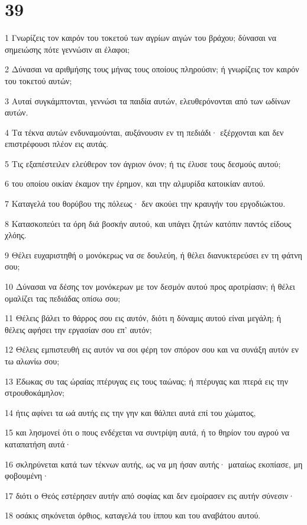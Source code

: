 \chapter{39}

\par 1 Γνωρίζεις τον καιρόν του τοκετού των αγρίων αιγών του βράχου; δύνασαι να σημειώσης πότε γεννώσιν αι έλαφοι;
\par 2 Δύνασαι να αριθμήσης τους μήνας τους οποίους πληρούσιν; ή γνωρίζεις τον καιρόν του τοκετού αυτών;
\par 3 Αυταί συγκάμπτονται, γεννώσι τα παιδία αυτών, ελευθερόνονται από των ωδίνων αυτών.
\par 4 Τα τέκνα αυτών ενδυναμούνται, αυξάνουσιν εν τη πεδιάδι· εξέρχονται και δεν επιστρέφουσι πλέον εις αυτάς.
\par 5 Τις εξαπέστειλεν ελεύθερον τον άγριον όνον; ή τις έλυσε τους δεσμούς αυτού;
\par 6 του οποίου οικίαν έκαμον την έρημον, και την αλμυρίδα κατοικίαν αυτού.
\par 7 Καταγελά του θορύβου της πόλεως· δεν ακούει την κραυγήν του εργοδιώκτου.
\par 8 Κατασκοπεύει τα όρη διά βοσκήν αυτού, και υπάγει ζητών κατόπιν παντός είδους χλόης.
\par 9 Θέλει ευχαριστηθή ο μονόκερως να σε δουλεύη, ή θέλει διανυκτερεύσει εν τη φάτνη σου;
\par 10 Δύνασαι να δέσης τον μονόκερων με τον δεσμόν αυτού προς αροτρίασιν; ή θέλει ομαλίζει τας πεδιάδας οπίσω σου;
\par 11 Θέλεις βάλει το θάρρος σου εις αυτόν, διότι η δύναμις αυτού είναι μεγάλη; ή θέλεις αφήσει την εργασίαν σου επ' αυτόν;
\par 12 Θέλεις εμπιστευθή εις αυτόν να σοι φέρη τον σπόρον σου και να συνάξη αυτόν εν τω αλωνίω σου;
\par 13 Έδωκας συ τας ώραίας πτέρυγας εις τους ταώνας; ή πτέρυγας και πτερά εις την στρουθοκάμηλον;
\par 14 ήτις αφίνει τα ωά αυτής εις την γην και θάλπει αυτά επί του χώματος,
\par 15 και λησμονεί ότι ο πους ενδέχεται να συντρίψη αυτά, ή το θηρίον του αγρού να καταπατήση αυτά·
\par 16 σκληρύνεται κατά των τέκνων αυτής, ως να μη ήσαν αυτής· ματαίως εκοπίασε, μη φοβουμένη·
\par 17 διότι ο Θεός εστέρησεν αυτήν από σοφίας και δεν εμοίρασεν εις αυτήν σύνεσιν·
\par 18 οσάκις σηκόνεται όρθιος, καταγελά του ίππου και του αναβάτου αυτού.

